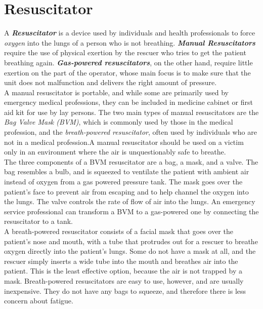 \documentclass[12pt]{article}
\begin{document}
\section{Resuscitator}
A \textbf{\emph{ Resuscitator}} is a device used by individuals and health professionals to force  \emph{ oxygen} into the lungs of a person who is not breathing.\newline
\textbf{\emph{Manual Resuscitators} }require the use of physical exertion by the rescuer who tries to get the patient breathing again. \textbf{\emph{Gas-powered resuscitators}}, on the other hand, require little exertion on the part of the operator, whose main focus is to make sure that the unit does not malfunction and delivers the right amount of pressure.\newline\\
A manual resuscitator is portable, and while some are primarily used by emergency medical professions, they can be included in medicine cabinet or first aid kit for use by lay persons. The two main types of manual resuscitators are the \emph{Bag Valve Mask (BVM)}, which is commonly used by those in the medical profession, and the \emph{breath-powered resuscitator}, often used by individuals who are not in a medical profession.A manual resuscitator should be used on a victim only in an environment where the air is unquestionably safe to breathe.\newline\\
The three components of a BVM resuscitator are a bag, a mask, and a valve. The bag resembles a bulb, and is squeezed to ventilate the patient with ambient air instead of oxygen from a gas powered pressure tank. The mask goes over the patient's face to prevent air from escaping and to help channel the oxygen into the lungs. The valve controls the rate of flow of air into the lungs. An emergency service professional can transform a BVM to a gas-powered one by connecting the resuscitator to a tank.\newline \\
A breath-powered resuscitator consists of a facial mask that goes over the patient's nose and mouth, with a tube that protrudes out for a rescuer to breathe oxygen directly into the patient's lungs.  Some do not have a mask at all, and the rescuer simply inserts a wide tube into the mouth and breathes air into the patient. This is the least effective option, because the air is not trapped by a mask. Breath-powered resuscitators are easy to use, however, and are usually inexpensive. They do not have any bags to squeeze, and therefore there is less concern about fatigue.\newline \\
\end{document}
